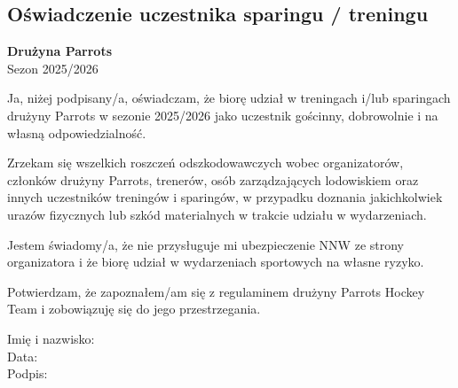 \documentclass[12pt,a4paper]{article}
\begin{document}
\begin{center}
\section*{Oświadczenie uczestnika sparingu / treningu}
\textbf{Drużyna Parrots}\\
Sezon 2025/2026
\end{center}

\vspace{1em}

Ja, niżej podpisany/a, oświadczam, że biorę udział w treningach i/lub sparingach drużyny Parrots w sezonie 2025/2026 jako uczestnik gościnny, dobrowolnie i na własną odpowiedzialność.

\bigskip

Zrzekam się wszelkich roszczeń odszkodowawczych wobec organizatorów, członków drużyny Parrots, trenerów, osób zarządzających lodowiskiem oraz innych uczestników treningów i sparingów, w przypadku doznania jakichkolwiek urazów fizycznych lub szkód materialnych w trakcie udziału w wydarzeniach.

\bigskip

Jestem świadomy/a, że nie przysługuje mi ubezpieczenie NNW ze strony organizatora i że biorę udział w wydarzeniach sportowych na własne ryzyko.

\bigskip

Potwierdzam, że zapoznałem/am się z regulaminem drużyny Parrots Hockey Team i zobowiązuję się do jego przestrzegania.

\vspace{2em}

\noindent Imię i nazwisko: \dotfill \\[2em]
Data: \dotfill \\[2em]
Podpis: \dotfill
\end{document}
